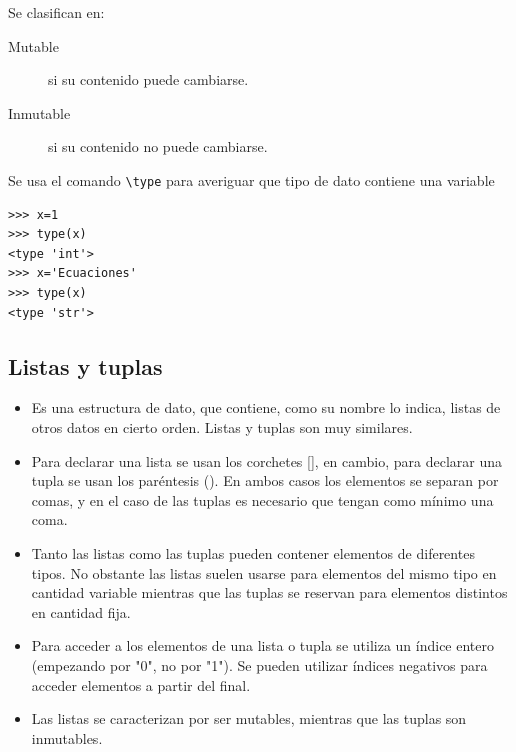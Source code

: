 Se clasifican en:
\begin{description}
 \item[Mutable] si su contenido puede cambiarse.
 \item[Inmutable] si su contenido no puede cambiarse.
\end{description}

Se usa el comando \verb~\type~ para averiguar que tipo de dato contiene una variable

 \begin{lstlisting}
>>> x=1
>>> type(x)
<type 'int'>
>>> x='Ecuaciones'
>>> type(x)
<type 'str'>
\end{lstlisting}





\subsection{Listas y tuplas}


\begin{itemize}

\item Es una estructura de dato, que contiene, como su nombre lo indica, listas de otros datos en cierto orden. Listas y tuplas son muy similares.

\item Para declarar una lista se usan los corchetes [], en cambio, para declarar una tupla se usan los paréntesis (). En ambos casos los elementos se separan por comas, y en el caso de las tuplas es necesario que tengan como mínimo una coma.

\item    Tanto las listas como las tuplas pueden contener elementos de diferentes tipos. No obstante las listas suelen usarse para elementos del mismo tipo en cantidad variable mientras que las tuplas se reservan para elementos distintos en cantidad fija.
    
\item Para acceder a los elementos de una lista o tupla se utiliza un índice entero (empezando por "0", no por "1"). Se pueden utilizar índices negativos para acceder elementos a partir del final.


\item Las listas se caracterizan por ser mutables, mientras que las tuplas son inmutables.

\end{itemize}







